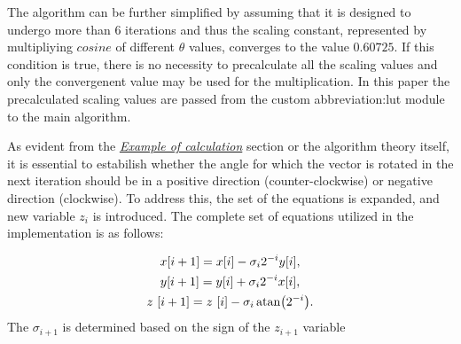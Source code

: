 \documentclass[a4paper, twoside, 11pt]{article}
\begin{document}
            The algorithm can be further simplified by assuming that it is designed to undergo more than 6 iterations and thus the scaling constant, represented by multipliying $cosine$ of different $\theta$ values, converges to the value $0.60725$. If this condition is true, there is no necessity to precalculate all the scaling values and only the convergenent value may be used for the multiplication. In this paper the precalculated scaling values are passed from the custom \gls{abbreviation:lut} module to the main algorithm.\par
            As evident from the \hyperref[subsubsec:example-of-calculation]{\textit{Example of calculation}} section or the algorithm theory itself, it is essential to estabilish whether the angle for which the vector is rotated in the next iteration should be in a positive direction (counter-clockwise) or negative direction (clockwise). To address this, the set of the equations is expanded, and new variable $z_i$ is introduced. The complete set of equations utilized in the implementation is as follows:

            \begin{equation}
                \begin{gathered}
                x [i+1] = x [i] - \sigma_i 2^{-i} y[i],\\
                y [i+1] = y [i] + \sigma_i 2^{-i} x[i],\\
                z~[i+1] = z~[i] - \sigma_i \atan (2^{-i}).
                \end{gathered}
            \end{equation}
            The $\sigma_{i+1}$ is determined based on the sign of the $z_{i+1}$ variable
\end{document}
